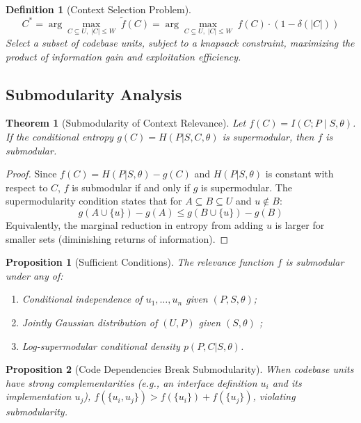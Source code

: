 \documentclass[11pt, a4paper, logo, copyright]{googledeepmind}
\newtheorem{definition}{Definition}[section]
\newtheorem{theorem}{Theorem}[section]
\newtheorem{proposition}{Proposition}[section]
\begin{document}
\begin{definition}[Context Selection Problem]
\label{def:csp}
$$C^* = \arg\max_{C \subseteq U,\; |C| \leq W} \; \tilde{f}(C) = \arg\max_{C \subseteq U,\; |C| \leq W} \; f(C) \cdot (1 - \delta(|C|))$$
Select a subset of codebase units, subject to a knapsack constraint, maximizing the product of information gain and exploitation efficiency.
\end{definition}

\subsection{Submodularity Analysis}

\begin{theorem}[Submodularity of Context Relevance]
\label{thm:submodularity}
Let $f(C) = I(C; P \mid S, \theta)$. If the conditional entropy $g(C) = H(P|S,C,\theta)$ is supermodular, then $f$ is submodular.
\end{theorem}

\begin{proof}
Since $f(C) = H(P|S,\theta) - g(C)$ and $H(P|S,\theta)$ is constant with respect to $C$, $f$ is submodular if and only if $g$ is supermodular. The supermodularity condition states that for $A \subseteq B \subseteq U$ and $u \notin B$:
$$g(A \cup \{u\}) - g(A) \leq g(B \cup \{u\}) - g(B)$$
Equivalently, the marginal reduction in entropy from adding $u$ is larger for smaller sets (diminishing returns of information).
\end{proof}

\begin{proposition}[Sufficient Conditions]
\label{prop:sufficient}
The relevance function $f$ is submodular under any of:
\begin{enumerate}[nosep,label=(\alph*)]
    \item Conditional independence of $u_1, \ldots, u_n$ given $(P, S, \theta)$;
    \item Jointly Gaussian distribution of $(U, P)$ given $(S, \theta)$ \citep{krause2008near};
    \item Log-supermodular conditional density $p(P, C | S, \theta)$.
\end{enumerate}
\end{proposition}

\begin{proposition}[Code Dependencies Break Submodularity]
\label{prop:break}
When codebase units have strong complementarities (e.g., an interface definition $u_i$ and its implementation $u_j$), $f(\{u_i, u_j\}) > f(\{u_i\}) + f(\{u_j\})$, violating submodularity.
\end{proposition}
\end{document}
